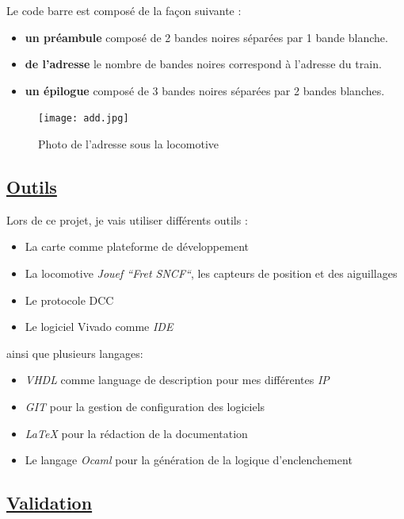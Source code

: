 Le code barre est compos\'e de la façon suivante :
\begin{itemize}
    \item \textbf{un pr\'eambule} compos\'e de 2 bandes noires
      s\'epar\'ees par 1 bande blanche.
    \item \textbf{de l'adresse} le nombre de bandes noires correspond
      à l'adresse du train. 
    \item \textbf{un \'epilogue} compos\'e de 3 bandes noires
      s\'epar\'ees par 2 bandes blanches.
\end{itemize}

\begin{figure}[h]
\centering
\texttt{[image: add.jpg]}
\caption{Photo de l'adresse sous la locomotive}
\label{fig6}
\end{figure}


\newpage
\subsection{\underline{Outils}}
\label{sec:outils}

Lors de ce projet, je vais utiliser diff\'erents outils :
\begin{itemize}
  \item La carte \crt comme plateforme de d\'eveloppement
  \item La locomotive \emph{Jouef ``Fret SNCF``}\cite{Jouef}, les capteurs de
    position et des aiguillages
  \item Le protocole DCC \cite{DCC}
  \item Le logiciel Vivado comme \emph{IDE}
\end{itemize}

ainsi que plusieurs langages:
\begin{itemize}
  \item \emph{VHDL}\cite{VHDL} comme language de description pour mes diff\'erentes
    \emph{IP}
  \item \emph{GIT}\cite{GIT} pour la gestion de configuration des logiciels
  \item \emph{\LaTeX}\cite{LATEX} pour la r\'edaction de la documentation
  \item Le langage \emph{Ocaml}\cite{OCAML} pour la g\'en\'eration de la logique d'enclenchement
\end{itemize}


\subsection{\underline{Validation}}
\label{sec:valid}

